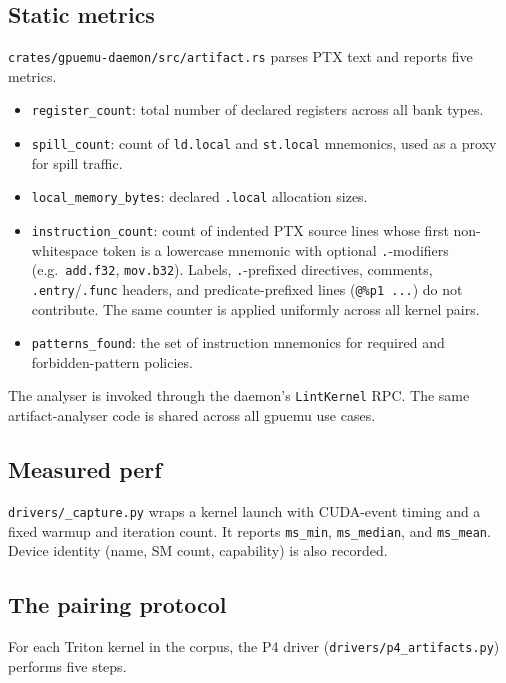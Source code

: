 \documentclass[runningheads]{llncs}
\begin{document}
\subsection{Static metrics}
\label{sec:method:static}

\texttt{crates/gpuemu-daemon/src/artifact.rs} parses PTX text and
reports five metrics.

\begin{itemize}
\item \texttt{register\_count}: total number of declared registers
across all bank types.
\item \texttt{spill\_count}: count of \texttt{ld.local} and
\texttt{st.local} mnemonics, used as a proxy for spill traffic.
\item \texttt{local\_memory\_bytes}: declared \texttt{.local}
allocation sizes.
\item \texttt{instruction\_count}: count of indented PTX source
lines whose first non-whitespace token is a lowercase mnemonic with
optional \texttt{.}-modifiers (e.g.\ \texttt{add.f32},
\texttt{mov.b32}). Labels, \texttt{.}-prefixed directives,
comments, \texttt{.entry}/\texttt{.func} headers, and
predicate-prefixed lines (\texttt{@\%p1 ...}) do not contribute.
The same counter is applied uniformly across all kernel pairs.
\item \texttt{patterns\_found}: the set of instruction mnemonics for
required and forbidden-pattern policies.
\end{itemize}

The analyser is invoked through the daemon's \texttt{LintKernel} RPC.
The same artifact-analyser code is shared across all gpuemu use cases.

\subsection{Measured perf}
\label{sec:method:perf}

\texttt{drivers/\_capture.py} wraps a kernel launch with CUDA-event
timing and a fixed warmup and iteration count. It reports
\texttt{ms\_min}, \texttt{ms\_median}, and \texttt{ms\_mean}. Device
identity (name, SM count, capability) is also recorded.

\subsection{The pairing protocol}
\label{sec:method:protocol}

For each Triton kernel in the corpus, the P4 driver
(\texttt{drivers/p4\_artifacts.py}) performs five steps.
\end{document}
